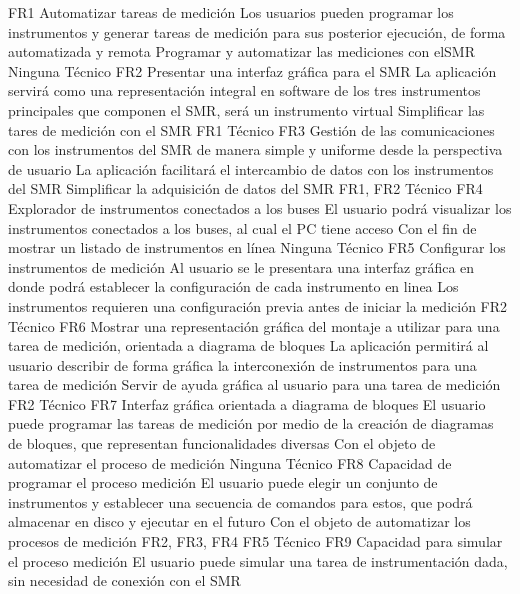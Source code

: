 \documentclass[paper=a4,oneside,fontsize=12pt]{article}
\newcommand{\SMR}{SMR\xspace}
\begin{document}
		{FR1}
			{Automatizar tareas de medición}
			{Los usuarios pueden programar los instrumentos y generar tareas de medición para sus posterior ejecución, de forma automatizada y remota}
			{Programar y automatizar las mediciones con el\SMR}
			{Ninguna}
			{Técnico}
		{FR2}
			{Presentar una interfaz gráfica para el \SMR}
			{La aplicación servirá como una representación integral en software de los tres instrumentos principales que componen el \SMR, será un instrumento virtual}
			{Simplificar las tares de medición con el \SMR}
			{FR1}
			{Técnico}
		{FR3}
			{Gestión de las comunicaciones con los instrumentos del \SMR de manera simple y uniforme desde la perspectiva de usuario}
			{La aplicación facilitará el intercambio de datos con los instrumentos del \SMR}
			{Simplificar la adquisición de datos del \SMR}
			{FR1, FR2}
			{Técnico}			
		{FR4}
			{Explorador de instrumentos conectados a los buses}
			{El usuario podrá visualizar los instrumentos conectados a los buses, al cual el PC tiene acceso}
			{Con el fin de mostrar un listado de instrumentos en línea}
			{Ninguna}
			{Técnico}
		{FR5}
			{Configurar los instrumentos de medición}
			{Al usuario se le presentara una interfaz gráfica en donde podrá establecer la configuración de cada instrumento en linea}
			{Los instrumentos requieren una configuración previa antes de iniciar la medición}
			{FR2}
			{Técnico}
		{FR6}
			{Mostrar una representación gráfica del montaje a utilizar para una tarea de medición, orientada a diagrama de bloques}
			{La aplicación permitirá al usuario describir de forma gráfica la interconexión de instrumentos para una tarea de medición}
			{Servir de ayuda gráfica al usuario para una tarea de medición}
			{FR2}
			{Técnico}
		{FR7}
			{Interfaz gráfica orientada a diagrama de bloques}
			{El usuario puede programar las tareas de medición por medio de la creación de diagramas de bloques, que representan funcionalidades diversas}
			{Con el objeto de automatizar el proceso de medición}	
			{Ninguna}		
			{Técnico}				
		{FR8}
			{Capacidad de programar el proceso medición}
			{El usuario puede elegir un conjunto de instrumentos y establecer una secuencia de comandos para estos, que podrá almacenar en disco y ejecutar en el futuro}
			{Con el objeto de automatizar los procesos de medición}
			{FR2, FR3, FR4 FR5}
			{Técnico}	
		{FR9}
			{Capacidad para simular el proceso medición}
			{El usuario puede simular una tarea de instrumentación dada, sin necesidad de conexión con el \SMR}
\end{document}
